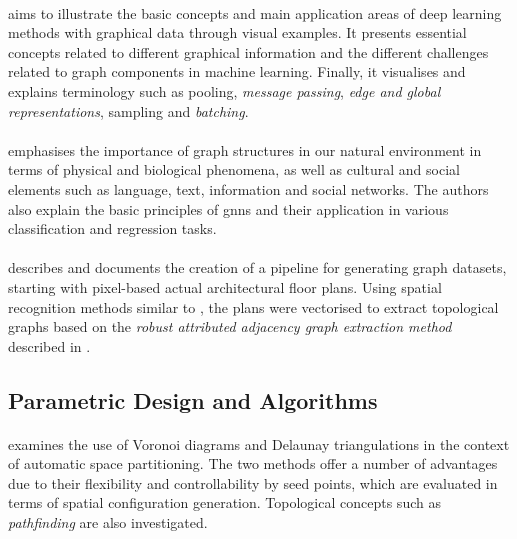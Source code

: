 \documentclass[a4paper, 12pt]{report}
\begin{document}
\paragraph{\cite{sanchez2021gentle}} aims to illustrate the basic concepts and main application areas of deep learning methods with graphical data through visual examples. It presents essential concepts related to different graphical information and the different challenges related to graph components in machine learning. Finally, it visualises and explains terminology such as \gls{pooling}, \textit{message passing}, \textit{edge and global representations}, \gls{sampling} and \textit{batching}.

\paragraph{\cite{velivckovic2023everything}} emphasises the importance of graph structures in our natural environment in terms of physical and biological phenomena, as well as cultural and social elements such as language, text, information and social networks. The authors also explain the basic principles of \acrlong{gnns} and their application in various classification and regression tasks.

\paragraph{\cite{ali2023architectural}} describes and documents the creation of a pipeline for generating graph datasets, starting with pixel-based actual architectural floor plans. Using spatial recognition methods similar to \cite{kalervo2019cubicasa5k}, the plans were vectorised to extract topological graphs based on the \textit{robust attributed adjacency graph extraction method} described in \cite{chen2022ro}.

\subsection*{Parametric Design and Algorithms}\label{subsec:parametric-design-and-algorithms-fr}

\paragraph{\cite{coates2005generating}} examines the use of Voronoi diagrams and Delaunay triangulations in the context of automatic space partitioning. The two methods offer a number of advantages due to their flexibility and controllability by seed points, which are evaluated in terms of spatial configuration generation. Topological concepts such as \textit{pathfinding} are also investigated.
\end{document}
